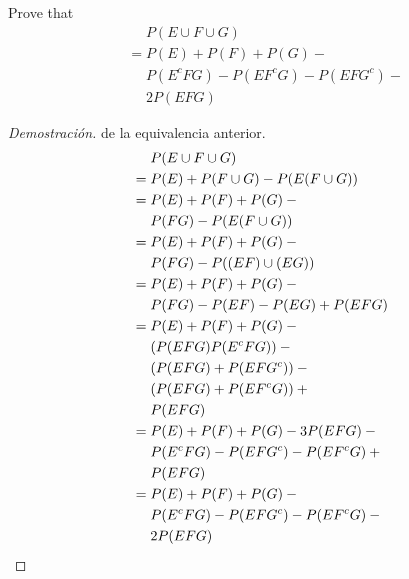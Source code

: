 \item Prove that 
\begin{align*}
    &\phantom{{}={}} P(E \cup F \cup G)\\
    &= P(E) + P(F) + P(G) - {}\\
    &\phantom{{}={}} P(E^cFG) - P(EF^cG) - P(EFG^c) - {}\\
    &\phantom{{}={}} 2 P(EFG)
\end{align*}

\begin{proof}[Demostración] de la equivalencia anterior.
    \begin{align*}
        &\phantom{{}={}} P(E \cup F \cup G)\\
        &= P(E) + P(F \cup G) - P(E (F \cup G))\\
        &= P(E) + P(F) + P(G) - {}\\
        &\phantom{{}={}} P(FG) - P(E (F \cup G))\\
        &= P(E) + P(F) + P(G) - {}\\
        &\phantom{{}={}} P(FG) - P((E F) \cup (E G))\\
        &= P(E) + P(F) + P(G) - {}\\
        &\phantom{{}={}} P(FG) - P(EF) - P(EG) + P(EFG)\\
        &= P(E) + P(F) + P(G) - {}\\
        &\phantom{{}={}} (P(EFG) P(E^cFG)) - {}\\
        &\phantom{{}={}} (P(EFG) + P(EFG^c)) - {}\\
        &\phantom{{}={}} (P(EFG) + P(EF^cG)) + {}\\
        &\phantom{{}={}} P(EFG)\\
        &= P(E) + P(F) + P(G) - 3 P(EFG) - {}\\
        &\phantom{{}={}} P(E^cFG) - P(EFG^c) - P(EF^cG) + {}\\
        &\phantom{{}={}} P(EFG)\\
        &= P(E) + P(F) + P(G) - {}\\
        &\phantom{{}={}} P(E^cFG) - P(EFG^c) - P(EF^cG) - {}\\
        &\phantom{{}={}} 2 P(EFG) \qedhere
    \end{align*}
    
\end{proof}